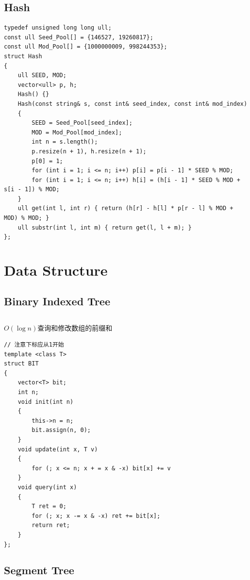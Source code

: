 \documentclass[twoside]{article}
\begin{document}
\subsection{Hash}
\begin{lstlisting}
typedef unsigned long long ull;
const ull Seed_Pool[] = {146527, 19260817};
const ull Mod_Pool[] = {1000000009, 998244353};
struct Hash
{
    ull SEED, MOD;
    vector<ull> p, h;
    Hash() {}
    Hash(const string& s, const int& seed_index, const int& mod_index)
    {
        SEED = Seed_Pool[seed_index];
        MOD = Mod_Pool[mod_index]; 
        int n = s.length();
        p.resize(n + 1), h.resize(n + 1);
        p[0] = 1;
        for (int i = 1; i <= n; i++) p[i] = p[i - 1] * SEED % MOD;
        for (int i = 1; i <= n; i++) h[i] = (h[i - 1] * SEED % MOD + s[i - 1]) % MOD;
    }
    ull get(int l, int r) { return (h[r] - h[l] * p[r - l] % MOD + MOD) % MOD; }
    ull substr(int l, int m) { return get(l, l + m); }
};\end{lstlisting}
\clearpage\section{Data Structure}
\subsection{Binary Indexed Tree}
\begin{lstlisting}
\end{lstlisting}
$O(\log n)$查询和修改数组的前缀和
\begin{lstlisting}
// 注意下标应从1开始
template <class T>
struct BIT
{
    vector<T> bit;
    int n;
    void init(int n)
    {
        this->n = n;
        bit.assign(n, 0);
    }
    void update(int x, T v)
    {
        for (; x <= n; x + = x & -x) bit[x] += v
    }
    void query(int x)
    {
        T ret = 0;
        for (; x; x -= x & -x) ret += bit[x];
        return ret;
    }
};\end{lstlisting}
\subsection{Segment Tree}
\end{document}
